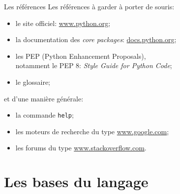\documentclass[dvipsnames]{beamer}
\providecommand{\tightlist}{%
  \setlength{\itemsep}{0pt}\setlength{\parskip}{0pt}}
\begin{document}
\begin{frame}
    [fragile]{Les références}
    Les références à garder à porter de souris:
    \begin{itemize}
        \tightlist
        \item le site officiel: \url{www.python.org};
        \item la documentation des \textit{core packages}:
              \url{docs.python.org};
        \item les PEP (Python Enhancement Proposals),\\ notamment le
                  {PEP 8: \textit{Style Guide for Python Code}};
        \item le {glossaire};
    \end{itemize}

    et d'une manière générale:
    \begin{itemize}
        \tightlist
        \item la commande \texttt{help};
        \item les moteurs de recherche du type \url{www.google.com};
        \item les forums du type \url{www.stackoverflow.com}.
    \end{itemize}

\end{frame}

\section{Les bases du langage}
\end{document}

